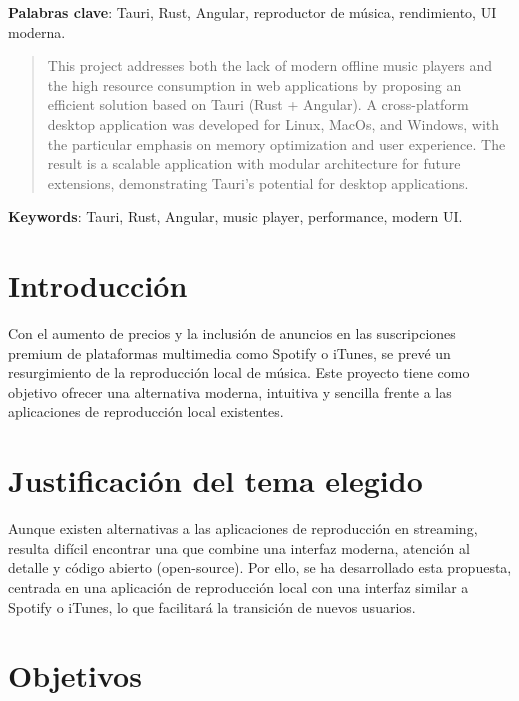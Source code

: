 \documentclass[11pt, a4paper]{article}
\begin{document}
\noindent \textbf{Palabras clave}: Tauri, Rust, Angular, reproductor de música, rendimiento, UI moderna.

\begin{abstract}
    This project addresses both the lack of modern offline music players and the high resource consumption in web applications by proposing an efficient solution based on Tauri (Rust + Angular). A cross-platform desktop application was developed for Linux, MacOs, and Windows, with the particular emphasis on memory optimization and user experience. The result is a scalable application with modular architecture for future extensions, demonstrating Tauri's potential for desktop applications.
\end{abstract}

\noindent \textbf{Keywords}: Tauri, Rust, Angular, music player, performance, modern UI.


\clearpage

\tableofcontents
\listoffigures
\listoftables
\lstlistoflistings


\clearpage


\setcounter{page}{1}
\section{Introducción}

Con el aumento de precios y la inclusión de anuncios en las suscripciones premium de plataformas multimedia como Spotify o iTunes, se prevé un resurgimiento de la reproducción local de música. Este proyecto tiene como objetivo ofrecer una alternativa moderna, intuitiva y sencilla frente a las aplicaciones de reproducción local existentes.


\section{Justificación del tema elegido}

Aunque existen alternativas a las aplicaciones de reproducción en streaming, resulta difícil encontrar una que combine una interfaz moderna, atención al detalle y código abierto (open-source). Por ello, se ha desarrollado esta propuesta, centrada en una aplicación de reproducción local con una interfaz similar a Spotify o iTunes, lo que facilitará la transición de nuevos usuarios.

\section{Objetivos}
\end{document}
